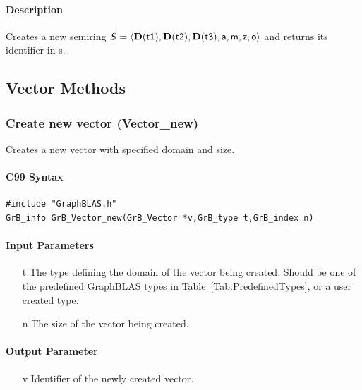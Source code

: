 \documentclass[11pt]{extarticle}
\begin{document}
\paragraph{Description}

Creates a new semiring $S = \langle \bold{D}({\sf t1}), \bold{D}({\sf t2}), \bold{D}({\sf t3}), {\sf a}, {\sf m}, {\sf z}, {\sf o} \rangle$ and
returns its identifier in {\sf s}.



\subsection{Vector Methods}

\subsubsection{Create new vector ({\sf Vector\_new})}

Creates a new vector with specified domain and size.

\paragraph{C99 Syntax}

\begin{verbatim}
#include "GraphBLAS.h"
GrB_info GrB_Vector_new(GrB_Vector *v,GrB_type t,GrB_index n)
\end{verbatim}

\paragraph{Input Parameters}

\begin{itemize}
	\item[{\sf t}] The type defining the domain of the vector being created. Should be one of the predefined
	GraphBLAS types in Table~\ref{Tab:PredefinedTypes}, or a user created type.
	\item[{\sf n}] The size of the vector being created.
\end{itemize}

\paragraph{Output Parameter}

\begin{itemize}
	\item[{\sf v}] Identifier of the newly created vector.
\end{itemize}
\end{document}
